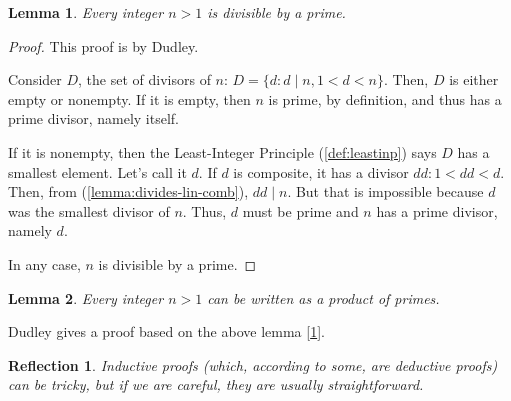 \documentclass[english,notitlepage,smartquotes]{hgbreport}
\theoremstyle{definition}
\theoremstyle{remark}
\theoremstyle{plain}
\newtheorem{lemma}{Lemma}[chapter]
\newtheorem{reflection}{Reflection}
\begin{document}
\begin{lemma}
\label{lemma:int-div-prime}
Every integer $n>1$ is divisible by a prime.
\end{lemma}
\begin{proof}
This proof is by Dudley.

Consider $D$, the set of divisors of $n$: $D=\{d: d\mid n, 1<d<n\}$. Then, $D$ is either empty or nonempty. If it is empty, then $n$ is prime, by definition, and thus has a prime divisor, namely itself.  

If it is nonempty, then the Least-Integer Principle (\ref{def:leastinp}) says $D$ has a smallest element. Let's call it $d$. If $d$ is composite, it has a divisor $dd: 1<dd<d$. Then, from (\ref{lemma:divides-lin-comb}), $dd\mid n$. But that is impossible because $d$ was the smallest divisor of $n$. Thus, $d$ must be prime and $n$ has a prime divisor, namely $d$.

In any case, $n$ is divisible by a prime.
\end{proof}

\begin{lemma}
Every integer $n>1$ can be written as a product of primes.
\end{lemma}
Dudley gives a proof based on the above lemma [\ref{lemma:int-div-prime}].
\begin{reflection}
Inductive proofs (which, according to some, are deductive proofs) can be tricky, but if we are careful, they are usually straightforward.
\end{reflection}
\end{document}
